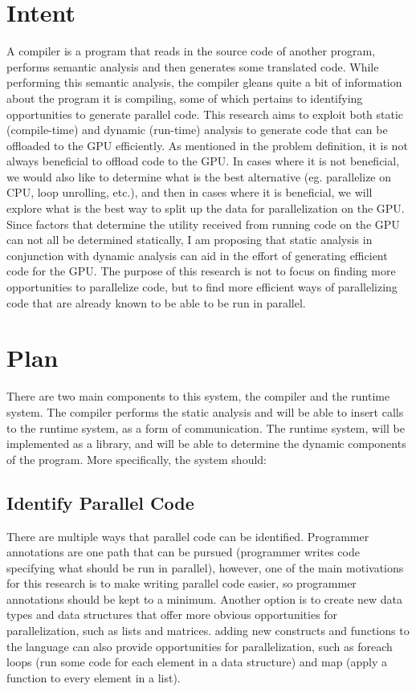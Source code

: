 \documentclass[a4paper,12pt]{article}
\begin{document}
\section{Intent}
A compiler is a program that reads in the source code of another program, performs semantic analysis and then generates some translated code.  While performing this semantic analysis, the compiler gleans quite a bit of information about the program it is compiling, some of which pertains to identifying opportunities to generate parallel code. This research aims to exploit both static (compile-time) and dynamic (run-time) analysis to generate code that can be offloaded to the GPU efficiently.  As mentioned in the problem definition, it is not always beneficial to offload code to the GPU.  In cases where it is not beneficial, we would also like to determine what is the best alternative (eg. parallelize on CPU, loop unrolling, etc.), and then in cases where it is beneficial, we will explore what is the best way to split up the data for parallelization on the GPU.  Since factors that determine the utility received from running code on the GPU can not all be determined statically, I am proposing that static analysis in conjunction with dynamic analysis can aid in the effort of generating efficient code for the GPU.  The purpose of this research is not to focus on finding more opportunities to parallelize code, but to find more efficient ways of parallelizing code that are already known to be able to be run in parallel.
\section{Plan}
There are two main components to this system, the compiler and the runtime system.  The compiler performs the static analysis and will be able to insert calls to the runtime system, as a form of communication.  The runtime system, will be implemented as a library, and will be able to determine the dynamic components of the program.  More specifically, the system should:
\subsection{Identify Parallel Code}
There are multiple ways that parallel code can be identified.  Programmer annotations are one path that can be pursued (programmer writes code specifying what should be run in parallel)\cite{annotations}, however, one of the main motivations for this research is to make writing parallel code easier, so programmer annotations should be kept to a minimum.  Another option is to create new data types and data structures that offer more obvious opportunities for parallelization, such as lists and matrices.  adding new constructs and functions to the language can also provide opportunities for parallelization, such as foreach loops (run some code for each element in a data structure) and map (apply a function to every element in a list).
\end{document}
